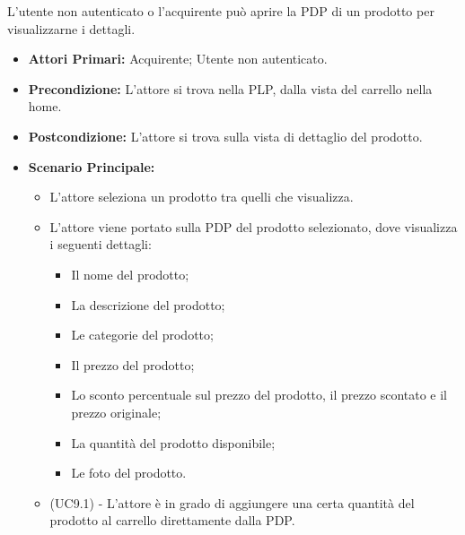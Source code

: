 
L'utente non autenticato o l'acquirente può aprire la PDP di un prodotto per visualizzarne i dettagli. 
\begin{itemize}
    \item \textbf{Attori Primari:} Acquirente; Utente non autenticato.
    \item \textbf{Precondizione:} L'attore si trova nella PLP, dalla vista del carrello nella home.
    \item \textbf{Postcondizione:} L'attore si trova sulla vista di dettaglio del prodotto.
    \item \textbf{Scenario Principale:}
        \begin{itemize}
            \item L'attore seleziona un prodotto tra quelli che visualizza.
            \item L'attore viene portato sulla PDP del prodotto selezionato, dove visualizza i seguenti dettagli:
            \begin{itemize}
                \item Il nome del prodotto;
                \item La descrizione del prodotto;
                \item Le categorie del prodotto;
                \item Il prezzo del prodotto;
                \item Lo sconto percentuale sul prezzo del prodotto, il prezzo scontato e il prezzo originale;
                \item La quantità del prodotto disponibile;
                \item Le foto del prodotto.
            \end{itemize}
            \item (UC9.1) - L'attore è in grado di aggiungere una certa quantità del prodotto al carrello direttamente dalla PDP. 
        \end{itemize}
\end{itemize}


